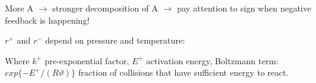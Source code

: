 \documentclass[10pt,a4paper]{scrartcl}
\begin{document}
\begin{multicols*}{3}




More A $\rightarrow$ stronger decomposition of A $\rightarrow$ pay attention to sign when negative feedback is happening!



$r^+$ and $r^-$ depend on pressure and temperature:



Where $k^+$ pre-exponential factor, $E^+$ activation energy, Boltzmann term: $exp\{-E^+/(R\vartheta)\}$ fraction of collisions that have sufficient energy to react.




\end{multicols*}
\end{document}
